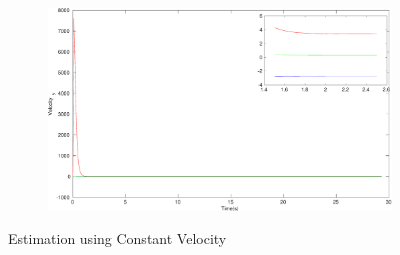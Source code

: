 \begin{figure}[h]
\begin{subfigure}{.5\linewidth}
\end{subfigure}
\begin{subfigure}{.5\linewidth}
\centering
\includegraphics[width=.9\linewidth]{figures/HInf/s3cvHInfVelocity_y}
\end{subfigure}
\caption{Estimation using Constant Velocity}
\end{figure}

